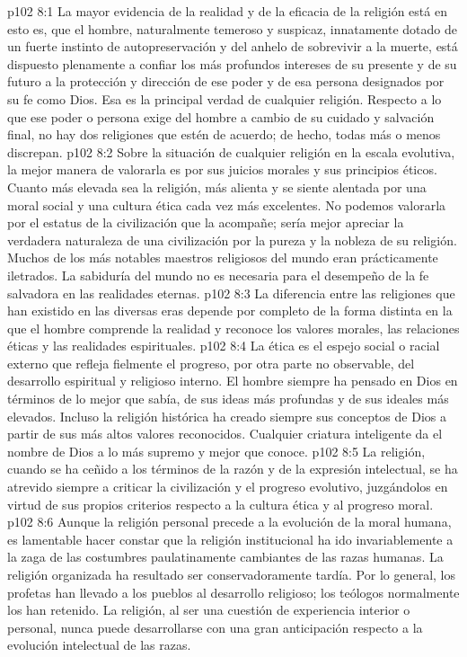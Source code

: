 \vs p102 8:1 La mayor evidencia de la realidad y de la eficacia de la religión está en  esto es, que el hombre, naturalmente temeroso y suspicaz, innatamente dotado de un fuerte instinto de autopreservación y del anhelo de sobrevivir a la muerte, está dispuesto plenamente a confiar los más profundos intereses de su presente y de su futuro a la protección y dirección de ese poder y de esa persona designados por su fe como Dios. Esa es la principal verdad de cualquier religión. Respecto a lo que ese poder o persona exige del hombre a cambio de su cuidado y salvación final, no hay dos religiones que estén de acuerdo; de hecho, todas más o menos discrepan.
\vs p102 8:2 Sobre la situación de cualquier religión en la escala evolutiva, la mejor manera de valorarla es por sus juicios morales y sus principios éticos. Cuanto más elevada sea la religión, más alienta y se siente alentada por una moral social y una cultura ética cada vez más excelentes. No podemos valorarla por el estatus de la civilización que la acompañe; sería mejor apreciar la verdadera naturaleza de una civilización por la pureza y la nobleza de su religión. Muchos de los más notables maestros religiosos del mundo eran prácticamente iletrados. La sabiduría del mundo no es necesaria para el desempeño de la fe salvadora en las realidades eternas.
\vs p102 8:3 La diferencia entre las religiones que han existido en las diversas eras depende por completo de la forma distinta en la que el hombre comprende la realidad y reconoce los valores morales, las relaciones éticas y las realidades espirituales.
\vs p102 8:4 \pc La ética es el espejo social o racial externo que refleja fielmente el progreso, por otra parte no observable, del desarrollo espiritual y religioso interno. El hombre siempre ha pensado en Dios en términos de lo mejor que sabía, de sus ideas más profundas y de sus ideales más elevados. Incluso la religión histórica ha creado siempre sus conceptos de Dios a partir de sus más altos valores reconocidos. Cualquier criatura inteligente da el nombre de Dios a lo más supremo y mejor que conoce.
\vs p102 8:5 La religión, cuando se ha ceñido a los términos de la razón y de la expresión intelectual, se ha atrevido siempre a criticar la civilización y el progreso evolutivo, juzgándolos en virtud de sus propios criterios respecto a la cultura ética y al progreso moral.
\vs p102 8:6 Aunque la religión personal precede a la evolución de la moral humana, es lamentable hacer constar que la religión institucional ha ido invariablemente a la zaga de las costumbres paulatinamente cambiantes de las razas humanas. La religión organizada ha resultado ser conservadoramente tardía. Por lo general, los profetas han llevado a los pueblos al desarrollo religioso; los teólogos normalmente los han retenido. La religión, al ser una cuestión de experiencia interior o personal, nunca puede desarrollarse con una gran anticipación respecto a la evolución intelectual de las razas.
